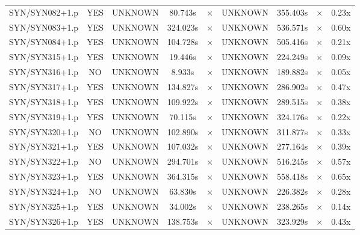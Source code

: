 \documentclass[a4paper,10pt]{article}
\begin{document}
\begin{longtable}{lcccccccc}
SYN/SYN082+1.p & YES & UNKNOWN & 80.743s & \cellcolor{mismatchcolor}$\times$ & UNKNOWN & 355.403s & \cellcolor{mismatchcolor}$\times$ & 0.23x \\
SYN/SYN083+1.p & YES & UNKNOWN & 324.023s & \cellcolor{mismatchcolor}$\times$ & UNKNOWN & 536.571s & \cellcolor{mismatchcolor}$\times$ & 0.60x \\
SYN/SYN084+1.p & YES & UNKNOWN & 104.728s & \cellcolor{mismatchcolor}$\times$ & UNKNOWN & 505.416s & \cellcolor{mismatchcolor}$\times$ & 0.21x \\
SYN/SYN315+1.p & YES & UNKNOWN & 19.446s & \cellcolor{mismatchcolor}$\times$ & UNKNOWN & 224.249s & \cellcolor{mismatchcolor}$\times$ & 0.09x \\
SYN/SYN316+1.p & NO & UNKNOWN & 8.933s & \cellcolor{mismatchcolor}$\times$ & UNKNOWN & 189.882s & \cellcolor{mismatchcolor}$\times$ & 0.05x \\
SYN/SYN317+1.p & YES & UNKNOWN & 134.827s & \cellcolor{mismatchcolor}$\times$ & UNKNOWN & 286.902s & \cellcolor{mismatchcolor}$\times$ & 0.47x \\
SYN/SYN318+1.p & YES & UNKNOWN & 109.922s & \cellcolor{mismatchcolor}$\times$ & UNKNOWN & 289.515s & \cellcolor{mismatchcolor}$\times$ & 0.38x \\
SYN/SYN319+1.p & YES & UNKNOWN & 70.115s & \cellcolor{mismatchcolor}$\times$ & UNKNOWN & 324.176s & \cellcolor{mismatchcolor}$\times$ & 0.22x \\
SYN/SYN320+1.p & NO & UNKNOWN & 102.890s & \cellcolor{mismatchcolor}$\times$ & UNKNOWN & 311.877s & \cellcolor{mismatchcolor}$\times$ & 0.33x \\
SYN/SYN321+1.p & YES & UNKNOWN & 107.032s & \cellcolor{mismatchcolor}$\times$ & UNKNOWN & 277.164s & \cellcolor{mismatchcolor}$\times$ & 0.39x \\
SYN/SYN322+1.p & NO & UNKNOWN & 294.701s & \cellcolor{mismatchcolor}$\times$ & UNKNOWN & 516.245s & \cellcolor{mismatchcolor}$\times$ & 0.57x \\
SYN/SYN323+1.p & YES & UNKNOWN & 364.315s & \cellcolor{mismatchcolor}$\times$ & UNKNOWN & 558.418s & \cellcolor{mismatchcolor}$\times$ & 0.65x \\
SYN/SYN324+1.p & NO & UNKNOWN & 63.830s & \cellcolor{mismatchcolor}$\times$ & UNKNOWN & 226.382s & \cellcolor{mismatchcolor}$\times$ & 0.28x \\
SYN/SYN325+1.p & YES & UNKNOWN & 34.002s & \cellcolor{mismatchcolor}$\times$ & UNKNOWN & 238.265s & \cellcolor{mismatchcolor}$\times$ & 0.14x \\
SYN/SYN326+1.p & YES & UNKNOWN & 138.753s & \cellcolor{mismatchcolor}$\times$ & UNKNOWN & 323.929s & \cellcolor{mismatchcolor}$\times$ & 0.43x \\

\end{longtable}
\end{document}
